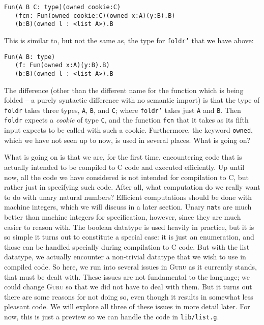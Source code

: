 \documentclass{book}[12pt]
\newcommand{\guru}[0]{\textsc{Guru}\xspace}
\begin{document}
\begin{verbatim}
Fun(A B C: type)(owned cookie:C)
   (fcn: Fun(owned cookie:C)(owned x:A)(y:B).B)
   (b:B)(owned l : <list A>).B
\end{verbatim}

\noindent This is similar to, but not the same as, the type for
\texttt{foldr'} that we have above:

\begin{verbatim}
Fun(A B: type)
   (f: Fun(owned x:A)(y:B).B)
   (b:B)(owned l : <list A>).B
\end{verbatim}

\noindent The difference (other than the different name for the
function which is being folded -- a purely syntactic difference with
no semantic import) is that the type of \texttt{foldr} takes three
types, \texttt{A}, \texttt{B}, and \texttt{C}; where \texttt{foldr'}
takes just \texttt{A} and \texttt{B}.  Then \texttt{foldr} expects a
\emph{cookie} of type \texttt{C}, and the function \texttt{fcn} that
it takes as its fifth input expects to be called with such a cookie. 
Furthermore, the keyword \texttt{owned}, which we have not seen up to
now, is used in several places.  What is going on?

What is going on is that we are, for the first time, encountering code
that is actually intended to be compiled to C code and executed
efficiently.  Up until now, all the code we have considered is not
intended for compilation to C, but rather just in specifying such
code.  After all, what computation do we really want to do with unary
natural numbers?  Efficient computations should be done with machine
integers, which we will discuss in a later section.  Unary
\texttt{nat}s are much better than machine integers for specification,
however, since they are much easier to reason with.  The boolean
datatype is used heavily in practice, but it is so simple it turns out
to constitute a special case: it is just an enumeration, and those can
be handled specially during compilation to C code.  But with the list
datatype, we actually encounter a non-trivial datatype that we wish to
use in compiled code.  So here, we run into several issues in \guru as
it currently stands, that must be dealt with.  These issues are not
fundamental to the language; we could change \guru so that we did not
have to deal with them.  But it turns out there are some reasons for
not doing so, even though it results in somewhat less pleasant code.
We will explore all three of these issues in more detail later.  For
now, this is just a preview so we can handle the code in
\texttt{lib/list.g}.
\end{document}
